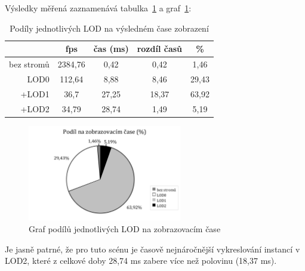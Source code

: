 \pagebreak
Výsledky měřená zaznamenává tabulka~\ref{table:lod012-contribs} a graf~\ref{gr:testCONTR}:

\begin{table}[!hbt]
\centering
\begin{tabular}{|r | c | c | c | c |} 
\hline 
 & fps & čas (ms) & rozdíl časů & \% \\
\hline
bez stromů		&2384,76	&0,42	&0,42	&1,46\\
LOD0			&112,64		&8,88	&8,46	&29,43\\
+LOD1			&36,7		&27,25	&18,37	&63,92\\
+LOD2			&34,79		&28,74	&1,49	&5,19\\
[1ex] 
\hline 
\end{tabular}
\caption{Podíly jednotlivých LOD na výsledném čase zobrazení\label{table:lod012-contribs}}
\end{table}

\begin{figure}[!hbt]
\begin{center}
\includegraphics[width=0.6\textwidth]{./graphs/LODsContrib.png}
\end{center}
\caption[Graf podílů jednotlivých LOD na zobrazovacím čase]%
{Graf podílů jednotlivých LOD na zobrazovacím čase\label{gr:testCONTR}
}
\end{figure}

Je jasně patrné, že pro tuto scénu je časově nejnáročnější vykreslování instancí v LOD2, které z celkové doby 28,74 ms zabere více než polovinu (18,37 ms). 


%

